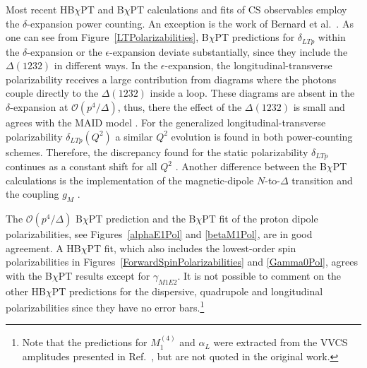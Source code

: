\documentclass[preprints,review,accept,moreauthors,pdftex]{Definitions/mdpi}
\def\al{\alpha}
\def\ga{\gamma} \def\Ga{{\it\Gamma}}
\def\de{\delta} \def\De{\Delta}
\begin{document}
Most recent HB$\chi$PT \cite{McGovern:2012ew,Griesshammer:2012we,Griesshammer:2015ahu} and B$\chi$PT \cite{Lensky:2008re,Lensky:2009uv,Lensky:2014efa, Lensky:2014dda,Lensky:2015awa,Lensky:2016nui,Alarcon:2020wjg, Alarcon:2020icz} calculations and fits of
CS observables employ the 
$\de$-expansion power counting. An exception is the work of Bernard et al.\ \cite{Bernard:2012hb}. As one can see from Figure~\ref{LTPolarizabilities}, B$\chi$PT predictions for $\delta_{LTp}$ within the $\delta$-expansion \cite{Lensky:2014dda,Alarcon:2020icz} or the $\epsilon$-expansion \cite{Bernard:2012hb} deviate substantially, since they include the $\Delta(1232)$ in different ways. In the $\epsilon$-expansion, the longitudinal-transverse polarizability receives a large contribution from diagrams where the photons couple directly to the $\Delta(1232)$ inside a loop. These diagrams are absent in the $\delta$-expansion at $\mathcal{O}(p
^4/\varDelta)$, thus, there the effect of the $\Delta(1232)$ is small and agrees with the MAID model \cite{MAID}. For the generalized longitudinal-transverse polarizability $\delta_{LTp}(Q^2)$ a similar $Q^2$ evolution is found in both power-counting schemes. Therefore, the discrepancy found for the static polarizability $\delta_{LTp}$ continues as a constant shift for all $Q^2$ \cite{Alarcon:2020icz}. Another difference between the B$\chi$PT calculations
\cite{Lensky:2015awa,Alarcon:2020icz,Bernard:2012hb} is the implementation of the magnetic-dipole $N$-to-$\Delta$ transition and the coupling $g_M$ \cite{Krebs:2019ddp}.

The $\mathcal{O}(p^4/\Delta)$ B$\chi$PT prediction \cite{Lensky:2015awa} and the B$\chi$PT fit \cite{Lensky:2014efa} of the proton dipole polarizabilities, see Figures~\ref{alphaE1Pol} and \ref{betaM1Pol}, are in good agreement. A HB$\chi$PT fit, which also includes the lowest-order spin polarizabilities in Figures~\ref{ForwardSpinPolarizabilities} and \ref{Gamma0Pol}, agrees with the B$\chi$PT results \cite{Lensky:2015awa,Lensky:2014efa} except for $\ga_{M1E2}$. It is not possible to comment on the other HB$\chi$PT predictions for the dispersive, quadrupole and longitudinal polarizabilities \cite{Knoechlein97,Nevado:2007dd} since they have no error bars.\footnote{Note that the predictions for $M_1
^{(4)}$ and $\al_L$ were extracted from the VVCS amplitudes presented in Ref.~\cite{Nevado:2007dd}, but are not quoted in the original work.}
 
\end{document}
